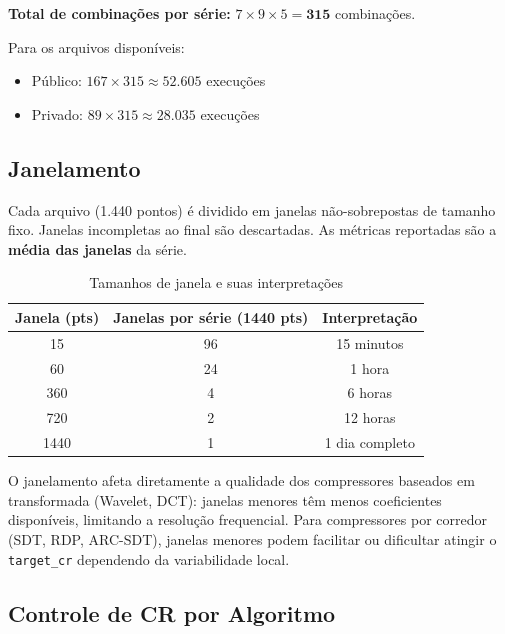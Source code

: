 \documentclass[12pt, a4paper]{article}
\begin{document}
\textbf{Total de combinações por série:} $7 \times 9 \times 5 = \mathbf{315}$ combinações.

Para os arquivos disponíveis:
\begin{itemize}
    \item Público: $167 \times 315 \approx 52.605$ execuções
    \item Privado: $89 \times 315 \approx 28.035$ execuções
\end{itemize}

\subsection{Janelamento}

Cada arquivo (1.440 pontos) é dividido em janelas não-sobrepostas de tamanho fixo. Janelas incompletas ao final são descartadas. As métricas reportadas são a \textbf{média das janelas} da série.

\begin{table}[H]
\centering
\caption{Tamanhos de janela e suas interpretações}
\begin{tabular}{ccc}
\toprule
\textbf{Janela (pts)} & \textbf{Janelas por série (1440 pts)} & \textbf{Interpretação} \\
\midrule
15   & 96 & 15 minutos \\
60   & 24 & 1 hora \\
360  & 4  & 6 horas \\
720  & 2  & 12 horas \\
1440 & 1  & 1 dia completo \\
\bottomrule
\end{tabular}
\end{table}

O janelamento afeta diretamente a qualidade dos compressores baseados em transformada (Wavelet, DCT): janelas menores têm menos coeficientes disponíveis, limitando a resolução frequencial. Para compressores por corredor (SDT, RDP, ARC-SDT), janelas menores podem facilitar ou dificultar atingir o \texttt{target\_cr} dependendo da variabilidade local.

\subsection{Controle de CR por Algoritmo}
\end{document}
